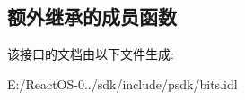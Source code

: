 \subsection*{额外继承的成员函数}


该接口的文档由以下文件生成\+:\begin{DoxyCompactItemize}
\item 
E\+:/\+React\+O\+S-\/0../sdk/include/psdk/bits.\+idl\end{DoxyCompactItemize}
